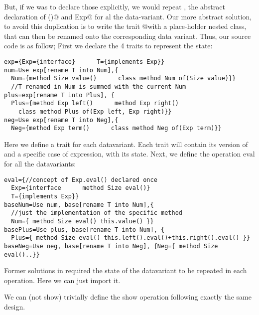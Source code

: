 But, if we was to declare those
explicitly, we would repeat \Q@Exp@, the abstract
declaration of \Q@eval()@ and \Q@implements Exp@
for al the data-variant.
Our more abstract solution, to avoid this duplication is to write 
the trait \Q@eval @with a place-holder \Q@T@ nested class, that can then be renamed
onto the corresponding data variant.
Thus, our source code is as follow;
First we declare the 4 traits to represent the state:
\begin{lstlisting}
exp={Exp={interface}      T={implements Exp}}
num=Use exp[rename T into Num],{
  Num={method Size value()      class method Num of(Size value)}}
  //T renamed in Num is summed with the current Num
plus=exp[rename T into Plus], {
  Plus={method Exp left()      method Exp right()
    class method Plus of(Exp left, Exp right)}}
neg=Use exp[rename T into Neg],{
  Neg={method Exp term()      class method Neg of(Exp term)}}
\end{lstlisting}
Here we define a trait for each datavariant.
Each trait will contain its version of \Q@Exp@
and a specific case of expression, with its state.
Next, we define the operation eval for all the datavariants:
\begin{lstlisting}
eval={//concept of Exp.eval() declared once
  Exp={interface      method Size eval()}
  T={implements Exp}}
baseNum=Use num, base[rename T into Num],{
  //just the implementation of the specific method
  Num={ method Size eval() this.value() }}
basePlus=Use plus, base[rename T into Num], {
  Plus={ method Size eval() this.left().eval()+this.right().eval() }}
baseNeg=Use neg, base[rename T into Neg], {Neg={ method Size eval()..}}
\end{lstlisting}
Former solutions in \cite{deepfjig} required the state of the 
datavariant to be repeated in each operation.
Here we can just import it.

We can (not show) trivially define the show operation following exactly the same design.



